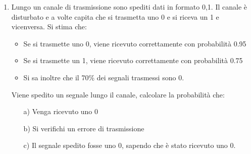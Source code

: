 \documentclass{report}
\begin{document}
\begin{enumerate}
    \item Lungo un canale di trasmissione sono spediti dati in formato {0,1}. Il canale è disturbato e a volte capita che si trasmetta uno 0 e si riceva un 1 e vicenversa. Si stima che: \begin{itemize}
        \item Se si trasmette uno 0, viene ricevuto correttamente con probabilità 0.95
        \item Se si trasmette un 1, viene ricevuto correttamente con probabilità 0.75
        \item Si sa inoltre che il 70\% dei segnali trasmessi sono 0.
    \end{itemize}
    Viene spedito un segnale lungo il canale, calcolare la probabilità che:
    \begin{itemize}
        \item [a)] Venga ricevuto uno 0
        \item [b)] Si verifichi un errore di trasmissione
        \item [c)] Il segnale spedito fosse uno 0, sapendo che è stato ricevuto uno 0.
    \end{itemize}

\end{enumerate}
\end{document}
